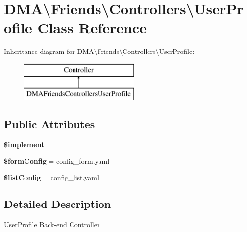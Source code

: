 \hypertarget{classDMA_1_1Friends_1_1Controllers_1_1UserProfile}{}\section{D\+M\+A\textbackslash{}Friends\textbackslash{}Controllers\textbackslash{}User\+Profile Class Reference}
\label{classDMA_1_1Friends_1_1Controllers_1_1UserProfile}
Inheritance diagram for D\+M\+A\textbackslash{}Friends\textbackslash{}Controllers\textbackslash{}User\+Profile\+:\begin{figure}[H]
\begin{center}
\leavevmode
\includegraphics[height=2.000000cm]{d6/dc9/classDMA_1_1Friends_1_1Controllers_1_1UserProfile}
\end{center}
\end{figure}
\subsection*{Public Attributes}
\begin{DoxyCompactItemize}
\item 
{\bfseries \$implement}
\item 
\hypertarget{classDMA_1_1Friends_1_1Controllers_1_1UserProfile_a681527d2fc9f3dfe1c4f9687df18cb28}{}{\bfseries \$form\+Config} = \textquotesingle{}config\+\_\+form.\+yaml\textquotesingle{}\label{classDMA_1_1Friends_1_1Controllers_1_1UserProfile_a681527d2fc9f3dfe1c4f9687df18cb28}

\item 
\hypertarget{classDMA_1_1Friends_1_1Controllers_1_1UserProfile_a7fcbc906cb7bbbec51f2cfdaacba0bf7}{}{\bfseries \$list\+Config} = \textquotesingle{}config\+\_\+list.\+yaml\textquotesingle{}\label{classDMA_1_1Friends_1_1Controllers_1_1UserProfile_a7fcbc906cb7bbbec51f2cfdaacba0bf7}

\end{DoxyCompactItemize}


\subsection{Detailed Description}
\hyperlink{classDMA_1_1Friends_1_1Controllers_1_1UserProfile}{User\+Profile} Back-\/end Controller 


